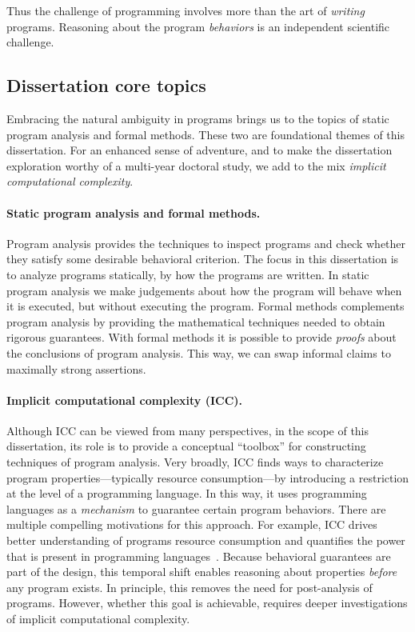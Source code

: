 \vspace{1em}\noindent{}Thus the challenge of programming involves more than the
art of \emph{writing} programs. Reasoning about the program \emph{behaviors} is
an independent scientific challenge.

\subsection{Dissertation core topics}
\label{subsec:dissertation-themes}

Embracing the natural ambiguity in programs brings us to the topics of static
program analysis and formal methods. These two are foundational themes of this
dissertation. For an enhanced sense of adventure, and to make the dissertation
exploration worthy of a multi-year doctoral study, we add to the mix
\emph{implicit computational complexity}.

\paragraph{Static program analysis and formal methods.}
Program analysis provides the techniques to inspect programs and check whether
they satisfy some desirable behavioral criterion. The focus in this dissertation
is to analyze programs statically, \ie by how the programs are written. In
static program analysis we make judgements about how the program will behave
when it is executed, but without executing the program. Formal methods
complements program analysis by providing the mathematical techniques needed to
obtain rigorous guarantees. With formal methods it is possible to provide
\emph{proofs} about the conclusions of program analysis. This way, we can swap
informal claims to maximally strong assertions.

\paragraph*{Implicit computational complexity (ICC).}
Although ICC can be viewed from many perspectives, in the scope of this
dissertation, its role is to provide a conceptual \enquote{toolbox} for
constructing techniques of program analysis. Very broadly, ICC finds ways to
characterize program properties---typically resource consumption---by
introducing a restriction at the level of a programming language. In this way,
it uses programming languages as a \emph{mechanism} to guarantee certain program
behaviors. There are multiple compelling motivations for this approach. For
example, ICC drives better understanding of programs resource consumption and
quantifies the power that is present in programming
languages~\cite{kristiansen2017}. Because behavioral guarantees are part of the
design, this temporal shift enables reasoning about properties \emph{before} any
program exists. In principle, this removes the need for post-analysis of
programs. However, whether this goal is achievable, requires deeper
investigations of implicit computational complexity.

